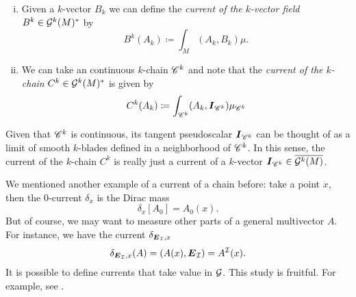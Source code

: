 \documentclass{article}
\begin{document}
\begin{enumerate}[i.]
    \item Given a $k$-vector $B_{k}$ we can define the \emph{current of the $k$-vector field} $B^k\in \mathcal{G}^k(M)^*$ by
\begin{equation}
\label{eq:multivector_current}
    B^k(A_k) \coloneqq \int_M (A_k,B_k) \mu.
\end{equation}

    \item We can take an continuous $k$-chain $\mathscr{C}^k$ and note that the \emph{current of the $k$-chain} $C^k \in \mathcal{G}^k(M)^*$ is given by
\begin{equation}
\label{eq:chain_current}
    C^k(A_k) \coloneqq \int_{\mathscr{C}^k} (A_k, \boldsymbol{I}_{\mathscr{C}^k}) \mu_{\mathscr{C}^k}
\end{equation}
\end{enumerate}
Given that $\mathscr{C}^k$ is continuous, its tangent pseudoscalar $\boldsymbol{I}_{\mathscr{C}^k}$ can be thought of as a limit of smooth $k$-blades defined in a neighborhood of $\mathscr{C}^k$. In this sense, the current of the $k$-chain $C^k$ is really just a current of a $k$-vector $\boldsymbol{I}_{\mathscr{C}^k}\in \overline{\mathcal{G}^k(M)}$. 

We mentioned another example of a current of a chain before: take a point $x$, then the 0-current $\delta_x$ is the Dirac mass
\begin{equation}
\delta_x[A_0] = A_0(x).
\end{equation}
But of course, we may want to measure other parts of a general multivector $A$. For instance, we have the current $\delta_{\boldsymbol{E}_\mathcal{I},x}$
\begin{equation}
    \delta_{\boldsymbol{E}_\mathcal{I},x}(A) = (A(x),\boldsymbol{E}_\mathcal{I}) = A^\mathcal{I}(x).
\end{equation}
It is possible to define currents that take value in $\mathcal{G}$. This study is fruitful. For example, see .
\end{document}
